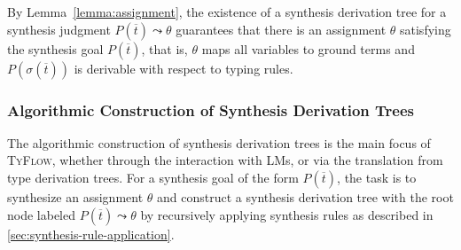 \documentclass[manuscript,screen]{acmart}
\makeatletter
\newcommand{\skhzc}[1]{#1}
\newcommand{\toolname}[1]{\textsc{#1}}
\newcommand{\mainname}{\toolname{TyFlow}\xspace}
\providecommand{\DIFadd}[1]{{\protect\color{blue}\uwave{#1}}} %
\providecommand{\DIFdel}[1]{{\protect\color{red}\sout{#1}}} %
\providecommand{\DIFaddbegin}{} %
\providecommand{\DIFaddend}{} %
\providecommand{\DIFdelbegin}{} %
\providecommand{\DIFdelend}{} %
\providecommand{\DIFscaledelfig}{0.5}
\newlength{\DIFdelgraphicswidth} %
\newlength{\DIFdelgraphicsheight} %
\providecommand{\DIFaddincludegraphics}[2][]{{\color{blue}\fbox{\DIFOincludegraphics[#1]{#2}}}} %
\providecommand{\DIFdelincludegraphics}[2][]{%
\sbox{\DIFdelgraphicsbox}{\DIFOincludegraphics[#1]{#2}}%
\settoboxwidth{\DIFdelgraphicswidth}{\DIFdelgraphicsbox} %
\settoboxtotalheight{\DIFdelgraphicsheight}{\DIFdelgraphicsbox} %
\scalebox{\DIFscaledelfig}{%
\parbox[b]{\DIFdelgraphicswidth}{\usebox{\DIFdelgraphicsbox}\\[-\baselineskip] \rule{\DIFdelgraphicswidth}{0em}}\llap{\resizebox{\DIFdelgraphicswidth}{\DIFdelgraphicsheight}{%
\setlength{\unitlength}{\DIFdelgraphicswidth}%
\begin{picture}(1,1)%
\thicklines\linethickness{2pt} %
{\color[rgb]{1,0,0}\put(0,0){\framebox(1,1){}}}%
{\color[rgb]{1,0,0}\put(0,0){\line( 1,1){1}}}%
{\color[rgb]{1,0,0}\put(0,1){\line(1,-1){1}}}%
\end{picture}%
}\hspace*{3pt}}} %
} %
\DeclareRobustCommand{\DIFaddbegin}{\DIFOaddbegin \let\includegraphics\DIFaddincludegraphics} %
\DeclareRobustCommand{\DIFaddend}{\DIFOaddend \let\includegraphics\DIFOincludegraphics} %
\DeclareRobustCommand{\DIFdelbegin}{\DIFOdelbegin \let\includegraphics\DIFdelincludegraphics} %
\DeclareRobustCommand{\DIFdelend}{\DIFOaddend \let\includegraphics\DIFOincludegraphics} %
\let\sout@orig\sout %
\renewcommand{\sout}[1]{\ifmmode\text{\sout@orig{\ensuremath{#1}}}\else\sout@orig{#1}\fi} %
\makeatother
\begin{document}
By Lemma~\ref{lemma:assignment}, the existence of a synthesis derivation tree for a synthesis judgment $P(\overline{t}) \leadsto \theta$ guarantees that there is an assignment $\theta$ satisfying the synthesis goal $P(\overline{t})$, that is, $\theta$ maps all variables to ground terms and \DIFdelbegin \DIFdel{$P(\sigma(\overline{t}))$ }\DIFdelend \DIFaddbegin \DIFadd{$P(\theta(\overline{t}))$ }\DIFaddend is derivable with respect to typing rules.

\subsubsection{Algorithmic Construction of Synthesis Derivation Trees}
\label{sec:synthtree-construction-query}
The algorithmic construction of synthesis derivation trees is the main focus of \mainname, whether through the interaction with LMs, or via the translation from type derivation trees.
For a synthesis goal of the form $P(\overline{t})$, the task is to synthesize an assignment $\theta$ and construct a synthesis derivation tree with the root node labeled $P(\overline{t}) \leadsto \theta$ by recursively applying synthesis rules as described in \autoref{sec:synthesis-rule-application}.

\end{document}
